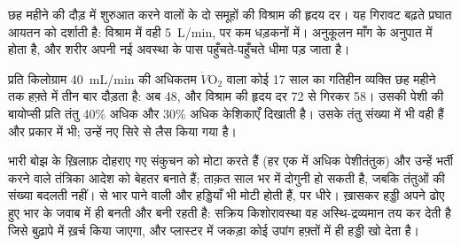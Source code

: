 \begin{omfigure}

{\small छह महीने की दौड़ में शुरुआत करने वालों के दो समूहों की विश्राम की
हृदय दर। यह गिरावट बढ़ते प्रघात आयतन को दर्शाती है: विश्राम में वही
\qty{5}{L/min}, पर कम धड़कनों में। अनुकूलन माँग के अनुपात में होता है, और
शरीर अपनी नई अवस्था के पास पहुँचते-पहुँचते धीमा पड़ जाता है।}
\end{omfigure}

\begin{example}[अनुकूलन के अंक]\label{ex:g10:sport-and-health:numbers}
प्रति किलोग्राम \qty{40}{mL/min} की अधिकतम $\dot V\!\mathrm{O_2}$ वाला
कोई 17 साल का गतिहीन व्यक्ति छह महीने तक हफ़्ते में तीन बार दौड़ता है:
अब \num{48}, और विश्राम की हृदय दर 72 से गिरकर 58। उसकी पेशी की बायोप्सी
प्रति तंतु 40\% अधिक  और 30\% अधिक केशिकाएँ दिखाती है। उसके
तंतु संख्या में भी वही हैं और प्रकार में भी; उन्हें नए सिरे से लैस किया
गया है।
\end{example}

\begin{proposition}[ताक़त के प्रशिक्षण से अनुकूलन]\label{prop:g10:sport-and-health:strength}
भारी बोझ के ख़िलाफ़ दोहराए गए संकुचन  को मोटा करते हैं (हर एक
में अधिक पेशीतंतुक) और उन्हें भर्ती करने वाले तंत्रिका आदेश को बेहतर बनाते
हैं; ताक़त साल भर में दोगुनी हो सकती है, जबकि तंतुओं की संख्या बदलती नहीं।
 से भार पाने वाली  और हड्डियाँ भी मोटी होती हैं, पर धीरे।
ख़ासकर हड्डी अपने ढोए हुए भार के जवाब में ही बनती और बनी रहती है: सक्रिय
किशोरावस्था वह अस्थि-द्रव्यमान तय कर देती है जिसे बुढ़ापे में ख़र्च किया
जाएगा, और प्लास्टर में जकड़ा कोई उपांग हफ़्तों में ही हड्डी खो देता है।
\end{proposition}
\admitted

